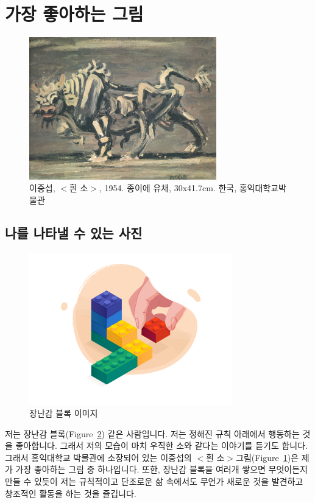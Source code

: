 \documentclass{article}
\begin{document}
\newpage

\section{가장 좋아하는 그림}
\label{sec:sec3}
\begin{figure}[!htbp]
	\begin{center}
		\includegraphics[width=230pt]{WhiteOx}
		\caption{이중섭, $<$흰 소$>$, 1954. 종이에 유채, 30x41.7cm. 한국, 홍익대학교박물관}
	\end{center}
	\label{fig:fig1}
\end{figure}

\subsection{나를 나타낼 수 있는 사진}
\label{sec3:subsec1}
\begin{figure}[!htbp]
	\begin{center}
		\includegraphics[width=250pt]{Block}
		\caption{장난감 블록 이미지}
	\end{center}
	\label{fig:fig2}
\end{figure}
\noindent 저는 장난감 블록(Figure~\ref{fig:fig2}) 같은 사람입니다. 저는 정해진 규칙 아래에서 행동하는 것을 좋아합니다.
그래서 저의 모습이 마치 우직한 소와 같다는 이야기를 듣기도 합니다. 그래서 홍익대학교 박물관에 소장되어 있는 이중섭의
$<$흰 소$>$그림(Figure~\ref{fig:fig1})은 제가 가장 좋아하는 그림 중 하나입니다. 또한, 장난감 블록을 여러개 쌓으면 무엇이든지
만들 수 있듯이 저는 규칙적이고 단조로운 삶 속에서도 무언가 새로운 것을 발견하고 창조적인 활동을 하는 것을 즐깁니다.
\end{document}
